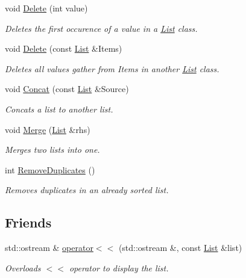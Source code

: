 \begin{DoxyCompactItemize}
void \hyperlink{class_c_s170_1_1_list_lab_1_1_list_a452d1d14fe5733b6ec42b0d35617ac6f}{Delete} (int value)
\begin{DoxyCompactList}\small\item\em Deletes the first occurence of a value in a \hyperlink{class_c_s170_1_1_list_lab_1_1_list}{List} class. \end{DoxyCompactList}\item 
void \hyperlink{class_c_s170_1_1_list_lab_1_1_list_af78c8902d170949b912b01926e9c658f}{Delete} (const \hyperlink{class_c_s170_1_1_list_lab_1_1_list}{List} \&Items)
\begin{DoxyCompactList}\small\item\em Deletes all values gather from Items in another \hyperlink{class_c_s170_1_1_list_lab_1_1_list}{List} class. \end{DoxyCompactList}\item 
void \hyperlink{class_c_s170_1_1_list_lab_1_1_list_a74fc2f4f2052f74cae8f66a479e913cf}{Concat} (const \hyperlink{class_c_s170_1_1_list_lab_1_1_list}{List} \&Source)
\begin{DoxyCompactList}\small\item\em Concats a list to another list. \end{DoxyCompactList}\item 
void \hyperlink{class_c_s170_1_1_list_lab_1_1_list_aca2bcc3631d3be1d7851f56a023a66c1}{Merge} (\hyperlink{class_c_s170_1_1_list_lab_1_1_list}{List} \&rhs)
\begin{DoxyCompactList}\small\item\em Merges two lists into one. \end{DoxyCompactList}\item 
int \hyperlink{class_c_s170_1_1_list_lab_1_1_list_aa749477476b218d08bb9eac1afe1c5b5}{Remove\-Duplicates} ()
\begin{DoxyCompactList}\small\item\em Removes duplicates in an already sorted list. \end{DoxyCompactList}\end{DoxyCompactItemize}
\subsection*{Friends}
\begin{DoxyCompactItemize}
\item 
std\-::ostream \& \hyperlink{class_c_s170_1_1_list_lab_1_1_list_a8e7f5af32d6d868ef12ac55254b7bfaf}{operator$<$$<$} (std\-::ostream \&, const \hyperlink{class_c_s170_1_1_list_lab_1_1_list}{List} \&list)
\begin{DoxyCompactList}\small\item\em Overloads $<$$<$ operator to display the list. \end{DoxyCompactList}\end{DoxyCompactItemize}


